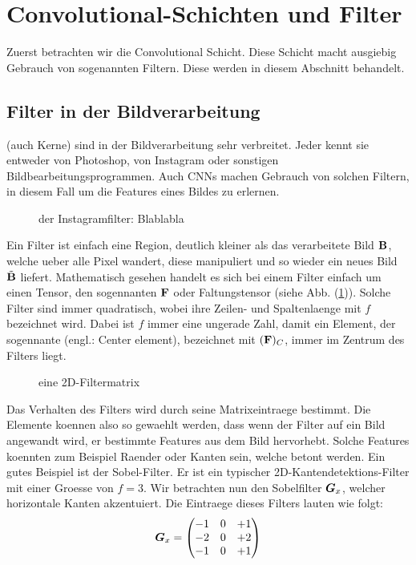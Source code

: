 \para{}
\cite{Goodfellow-et-al-2016}
\cite{deeplearning.ai:cnn}
\cite{wiki:cnn}


\section{Convolutional-Schichten und Filter}
Zuerst betrachten wir die Convolutional Schicht. Diese Schicht macht ausgiebig
Gebrauch von sogenannten Filtern. Diese werden in diesem Abschnitt behandelt.

\subsection{Filter in der Bildverarbeitung}
 (auch Kerne) sind in der Bildverarbeitung sehr verbreitet. Jeder kennt sie entweder
von Photoshop, von Instagram oder sonstigen Bildbearbeitungsprogrammen.
Auch CNNs machen Gebrauch von solchen Filtern, in diesem Fall um die Features eines Bildes zu
erlernen.
\begin{figure}[h!]

  \caption{der Instagramfilter: Blablabla}
\end{figure}

\para{}
Ein Filter ist einfach eine Region, deutlich kleiner als das verarbeitete Bild
$\mathbf{B}$, welche
ueber alle Pixel wandert, diese manipuliert und so wieder ein neues Bild
$\tilde{\mathbf{B}}$ liefert.
Mathematisch gesehen handelt es sich bei einem Filter einfach um einen Tensor,
den sogennanten  $\mathbf{F}$ oder Faltungstensor (siehe Abb.
(\ref{fig:filtermatrix})). Solche Filter sind immer quadratisch, wobei ihre
Zeilen- und Spaltenlaenge mit $f$ bezeichnet wird. Dabei ist $f$ immer eine ungerade Zahl, damit ein
Element, der sogennante  (engl.: Center element), bezeichnet mit $(\mathbf{F})_C$,
immer im Zentrum des Filters liegt. \\

\begin{figure}[h!]
  \caption{eine 2D-Filtermatrix}
  \label{fig:filtermatrix}
\end{figure}
\para{}
Das Verhalten des Filters wird durch seine Matrixeintraege bestimmt.
Die Elemente koennen also so gewaehlt werden, dass wenn der Filter auf ein Bild
angewandt wird, er bestimmte Features aus dem Bild hervorhebt. Solche Features
koennten zum Beispiel Raender oder Kanten sein, welche betont werden.
\para{}
Ein gutes Beispiel ist der Sobel-Filter. Er ist ein typischer 2D-Kantendetektions-Filter mit einer
Groesse von $f = 3$. Wir betrachten nun den Sobelfilter $\bm{G}_x$, welcher
horizontale Kanten akzentuiert. Die Eintraege dieses Filters lauten wie folgt:
\begin{equation*}
  \bm{G}_x =
  \begin{pmatrix}
    -1 & 0 & +1 \\
    -2 & 0 & +2 \\
    -1 & 0 & +1 \\
  \end{pmatrix}
\end{equation*}

